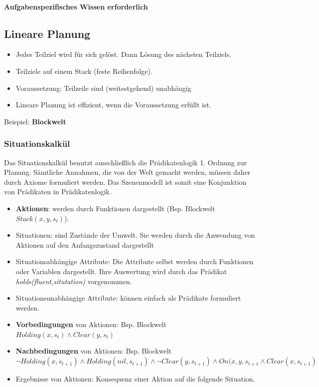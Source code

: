 \paragraph*{Aufgabenspezifisches Wissen erforderlich}

\subsection{Lineare Planung}
\begin{itemize}
	\item Jedes Teilziel wird für sich gelöst.
	Dann Lösung des nächsten Teilziels.
	\item Teilziele auf einem Stack (feste Reihenfolge).
	\item Voraussetzung: Teilzeile sind (weitestgehend) unabhängig
	\item Lineare Planung ist effizient, wenn die Voraussetzung erfüllt ist.
\end{itemize}
Beispiel: \textbf{Blockwelt}

\subsubsection{Situationskalkül}
Das Situationskalkül benutzt ausschließlich die Prädikatenlogik 1. Ordnung zur Planung.
Sämtliche Annahmen, die von der Welt gemacht werden, müssen daher durch Axiome formuliert werden.
Das Szenenmodell ist somit eine Konjunktion von Prädikaten in Prädikatenlogik.

\begin{itemize}
	\item \textbf{Aktionen}: werden durch Funktionen dargestellt (Bsp. Blockwelt $Stack(x,y,s_t)$).
	\item Situationen: sind Zustände der Umwelt.
	Sie werden durch die Anwendung von Aktionen auf den Anfangszustand dargestellt
	\item Situationsabhängige Attribute: Die Attribute selbst werden durch Funktionen oder Variablen dargestellt.
	Ihre Auswertung wird durch das Prädikat \emph{holds(fluent,situtation)} vorgenommen.
	\item Situationsunabhängige Attribute: können einfach als Prädikate formuliert werden.
	\item \textbf{Vorbedingungen} von Aktionen: Bsp. Blockwelt $Holding(x,s_t) \wedge Clear(y,s_t)$
	\item \textbf{Nachbedingungen} von Aktionen: Bsp. Blockwelt $\neg Holding(x, s_{t+1}) \wedge Holding(nil, s_{t+1}) \wedge \neg Clear(y, s_{t+1}) \wedge On(x,y,s_{t+1} \wedge Clear(x, s_{t+1})$
	\item Ergebnisse von Aktionen: Konsequenz einer Aktion auf die folgende Situation.
\end{itemize}

